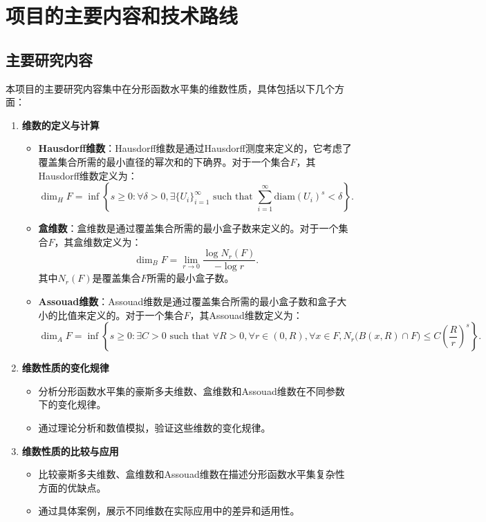\section{项目的主要内容和技术路线}

\subsection{主要研究内容}
\label{sec:main_content}

本项目的主要研究内容集中在分形函数水平集的维数性质，具体包括以下几个方面：

\begin{enumerate}
      \item \textbf{维数的定义与计算}
      \begin{itemize}
            \item \textbf{Hausdorff维数}：Hausdorff维数是通过Hausdorff测度来定义的，它考虑了覆盖集合所需的最小直径的幂次和的下确界。对于一个集合\(F\)，其Hausdorff维数定义为：
            \[
            \dim_H F = \inf \left\{ s \geq 0 : \forall \delta > 0, \exists \{U_i\}_{i=1}^\infty \text{ such that } \sum_{i=1}^\infty \text{diam}(U_i)^s < \delta \right\}.
            \]
            \item \textbf{盒维数}：盒维数是通过覆盖集合所需的最小盒子数来定义的。对于一个集合\(F\)，其盒维数定义为：
            \[
            \dim_B F = \lim_{r \to 0} \frac{\log N_r(F)}{-\log r}.
            \]
            其中\(N_r(F)\)是覆盖集合\(F\)所需的最小盒子数。
            \item \textbf{Assouad维数}：Assouad维数是通过覆盖集合所需的最小盒子数和盒子大小的比值来定义的。对于一个集合\(F\)，其Assouad维数定义为：
            \[
            \dim_A F = \inf \left\{ s \geq 0 : \exists C > 0 \text{ such that } \forall R > 0, \forall r \in (0, R), \forall x \in F, N_r\big(B(x, R) \cap F\big) \leq C \left( \frac{R}{r} \right)^s \right\}.
            \]
      \end{itemize}
      \item \textbf{维数性质的变化规律}
      \begin{itemize}
            \item 分析分形函数水平集的豪斯多夫维数、盒维数和Assouad维数在不同参数下的变化规律。
            \item 通过理论分析和数值模拟，验证这些维数的变化规律。
      \end{itemize}
      \item \textbf{维数性质的比较与应用}
      \begin{itemize}
            \item 比较豪斯多夫维数、盒维数和Assouad维数在描述分形函数水平集复杂性方面的优缺点。
            \item 通过具体案例，展示不同维数在实际应用中的差异和适用性。
      \end{itemize}
\end{enumerate}

